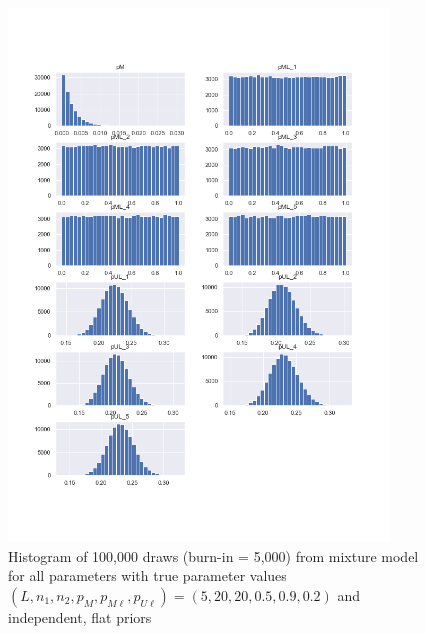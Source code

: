 \documentclass[11pt,reqno]{amsart}
\begin{document}
\begin{figure}[h!]
\begin{center}
\includegraphics[width=0.9\textwidth]{../Figures/mm/nM10/allParam_nM10_L5.png}
\vspace{-40pt}
\caption{Histogram of 100,000 draws (burn-in = 5,000) from mixture model for all parameters with true parameter values $(L, n_1, n_2, p_M, p_{M\ell}, p_{U\ell}) = (5, 20, 20, 0.5, 0.9, 0.2)$ and independent, flat priors}
\label{mmLarge}
\end{center}
\end{figure}
\end{document}
